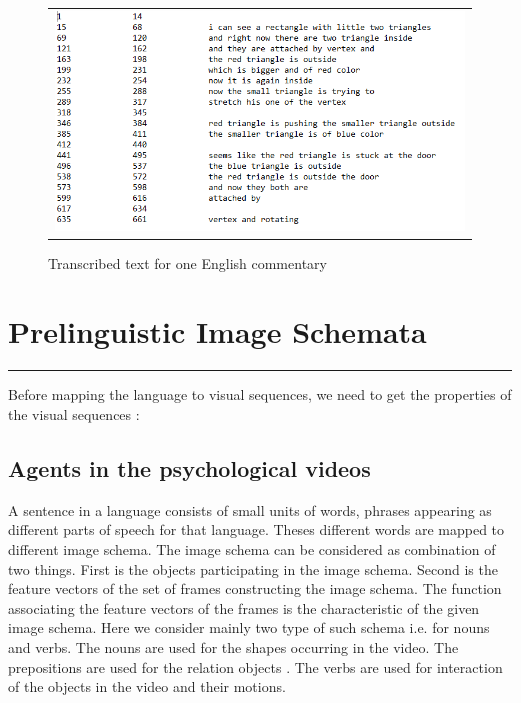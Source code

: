 \def\DevnagVersion{2.15}\documentclass[a4paper, 11pt, notitlepage]{report}
\begin{document}
\begin{figure}[h]
\center
\begin{tabular}{c}
\includegraphics[scale=0.70]{commEng.png}
\end{tabular}
\label{tab:gt}
\caption{Transcribed text for one English commentary}
\end{figure} 


\chapter{Prelinguistic Image Schemata}
\hrule height 2pt
\vspace*{10pt}
Before mapping the language to visual sequences, we need to get the properties of the visual sequences : \\
\section{Agents in the psychological videos}
\hspace*{30pt} A sentence in a language consists of small units of words, phrases appearing as different parts of speech for that language. Theses different words are mapped to different image schema. The image schema can be considered as combination of two things. First is the objects participating in the image schema. Second is the feature vectors of the set of frames constructing the image schema. The function associating the feature vectors of the frames is the characteristic of the given image schema. Here we consider mainly two type of such schema i.e. for nouns and verbs. The nouns are used for the shapes occurring in the video. The prepositions are used for the relation objects . The verbs are used for interaction of the objects in the video and their motions.\\
\end{document}
